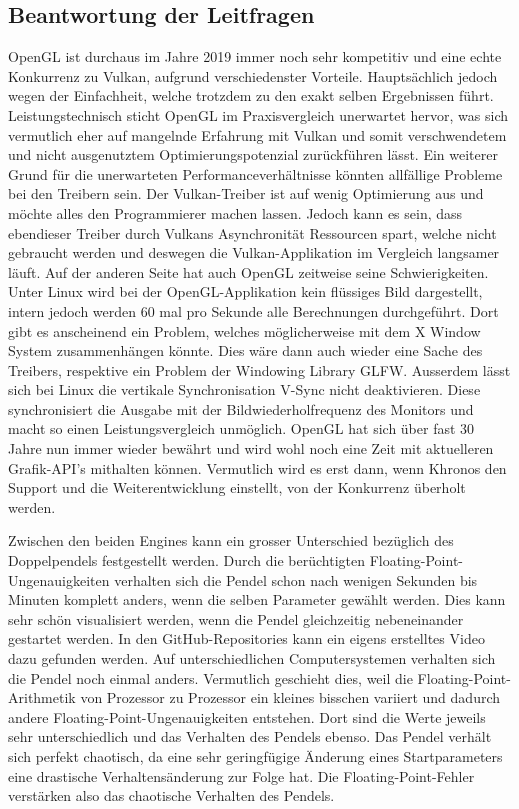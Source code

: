 \documentclass[titlepage, 11pt, a4paper, ngerman]{article}
\begin{document}
\subsection{Beantwortung der Leitfragen}
\acrshort{OpenGL} ist durchaus im Jahre 2019 immer noch sehr kompetitiv und eine echte Konkurrenz zu Vulkan, aufgrund verschiedenster Vorteile. Hauptsächlich jedoch wegen der Einfachheit, welche trotzdem zu den exakt selben Ergebnissen führt. Leistungstechnisch sticht \acrshort{OpenGL} im Praxisvergleich unerwartet hervor, was sich vermutlich eher auf mangelnde Erfahrung mit Vulkan und somit verschwendetem und nicht ausgenutztem Optimierungspotenzial zurückführen lässt. Ein weiterer Grund für die unerwarteten Performanceverhältnisse könnten allfällige Probleme bei den Treibern sein. Der Vulkan-Treiber ist auf wenig Optimierung aus und möchte alles den Programmierer machen lassen. Jedoch kann es sein, dass ebendieser Treiber durch Vulkans Asynchronität Ressourcen spart, welche nicht gebraucht werden und deswegen die Vulkan-Applikation im Vergleich langsamer läuft. Auf der anderen Seite hat auch \acrshort{OpenGL} zeitweise seine Schwierigkeiten. Unter \gls{Linux} wird bei der \acrshort{OpenGL}-Applikation kein flüssiges Bild dargestellt, intern jedoch werden 60 mal pro Sekunde alle Berechnungen durchgeführt. Dort gibt es anscheinend ein Problem, welches möglicherweise mit dem X Window System zusammenhängen könnte. Dies wäre dann auch wieder eine Sache des Treibers, respektive ein Problem der Windowing Library \acrshort{GLFW}. Ausserdem lässt sich bei \gls{Linux} die vertikale Synchronisation V-Sync nicht deaktivieren. Diese synchronisiert die Ausgabe mit der Bildwiederholfrequenz des Monitors und macht so einen Leistungsvergleich unmöglich. \acrshort{OpenGL} hat sich über fast 30 Jahre nun immer wieder bewährt und wird wohl noch eine Zeit mit aktuelleren Grafik-\acrshort{API}'s mithalten können. Vermutlich wird es erst dann, wenn Khronos den Support und die Weiterentwicklung einstellt, von der Konkurrenz überholt werden.\par
Zwischen den beiden \glspl{Engine} kann ein grosser Unterschied bezüglich des Doppelpendels festgestellt werden. Durch die berüchtigten \gls{Floating-Point}-Ungenauigkeiten verhalten sich die Pendel schon nach wenigen Sekunden bis Minuten komplett anders, wenn die selben Parameter gewählt werden. Dies kann sehr schön visualisiert werden, wenn die Pendel gleichzeitig nebeneinander gestartet werden. In den GitHub-Repositories kann ein eigens erstelltes Video dazu gefunden werden. Auf unterschiedlichen Computersystemen verhalten sich die Pendel noch einmal anders. Vermutlich geschieht dies, weil die \gls{Floating-Point}-Arithmetik von Prozessor zu Prozessor ein kleines bisschen variiert und dadurch andere \gls{Floating-Point}-Ungenauigkeiten entstehen. Dort sind die Werte jeweils sehr unterschiedlich und das Verhalten des Pendels ebenso. Das Pendel verhält sich perfekt chaotisch, da eine sehr geringfügige Änderung eines Startparameters eine drastische Verhaltensänderung zur Folge hat. Die \gls{Floating-Point}-Fehler verstärken also das chaotische Verhalten des Pendels.\par
\end{document}
